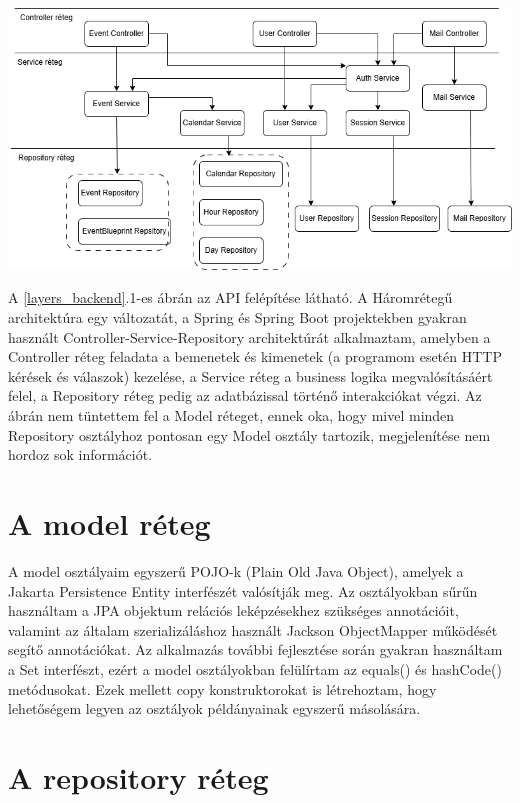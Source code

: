 \documentclass[a4paper,12pt]{report}
\theoremstyle{definition}
\theoremstyle{remark}
\begin{document}
\begin{center}
\includegraphics[width=150mm]{layers_backend}
\captionsetup{width=0.8\linewidth}
\label{layers_backend}
\end{center}

A \ref{layers_backend}.1-es ábrán az API felépítése látható. A Háromrétegű architektúra\cite{3layerwebsite} egy változatát, a Spring és Spring Boot projektekben gyakran használt Controller-Service-Repository architektúrát alkalmaztam, amelyben a Controller réteg feladata a bemenetek és kimenetek (a programom esetén HTTP kérések és válaszok) kezelése, a Service réteg a business logika megvalósításáért felel, a Repository réteg pedig az adatbázissal történő interakciókat végzi. Az ábrán nem tüntettem fel a Model réteget, ennek oka, hogy mivel minden Repository osztályhoz pontosan egy Model osztály tartozik, megjelenítése nem hordoz sok információt.

\section{A model réteg}

A model osztályaim egyszerű POJO-k (Plain Old Java Object), amelyek a Jakarta Persistence Entity interfészét valósítják meg. Az osztályokban sűrűn használtam a JPA objektum relációs leképzésekhez szükséges annotációit, valamint az általam szerializáláshoz használt Jackson ObjectMapper működését segítő annotációkat. Az alkalmazás további fejlesztése során gyakran használtam a Set interfészt, ezért a model osztályokban felülírtam az equals() és hashCode() metódusokat. Ezek mellett copy konstruktorokat is létrehoztam, hogy lehetőségem legyen az osztályok példányainak egyszerű másolására.

\section{A repository réteg}
\end{document}
